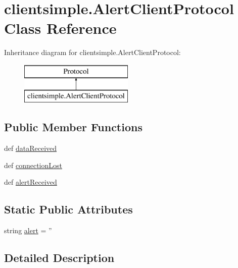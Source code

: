 \hypertarget{classclientsimple_1_1_alert_client_protocol}{\section{clientsimple.\-Alert\-Client\-Protocol Class Reference}
\label{classclientsimple_1_1_alert_client_protocol}
}
Inheritance diagram for clientsimple.\-Alert\-Client\-Protocol\-:\begin{figure}[H]
\begin{center}
\leavevmode
\includegraphics[height=2.000000cm]{d6/d57/classclientsimple_1_1_alert_client_protocol}
\end{center}
\end{figure}
\subsection*{Public Member Functions}
\begin{DoxyCompactItemize}
\item 
def \hyperlink{classclientsimple_1_1_alert_client_protocol_ab5758e25d1a8a3a3aedebc60e993707a}{data\-Received}
\item 
def \hyperlink{classclientsimple_1_1_alert_client_protocol_a6e14a76fc88330fd6bf638fe2e31e209}{connection\-Lost}
\item 
def \hyperlink{classclientsimple_1_1_alert_client_protocol_ab80801d12a754a9e1d0c358b798e56c3}{alert\-Received}
\end{DoxyCompactItemize}
\subsection*{Static Public Attributes}
\begin{DoxyCompactItemize}
\item 
string \hyperlink{classclientsimple_1_1_alert_client_protocol_aa51562cefc509b7022e1d23e0106dc5f}{alert} = ''
\end{DoxyCompactItemize}


\subsection{Detailed Description}


